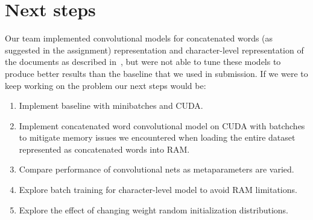 \documentclass{article} %
\begin{document}
	

	

\section{Next steps}
\label{next}
Our team implemented convolutional models for concatenated words (as suggested in the assignment) representation and character-level representation of the documents as described in~\cite{zhang15}, but were not able to tune these models to produce better results than the baseline that we used in submission.
If we were to keep working on the problem our next steps would be:
\begin{enumerate}
\item Implement baseline with minibatches and CUDA.
\item Implement concatenated word convolutional model on CUDA with batchches to mitigate memory issues we encountered when loading 
the entire dataset represented as concatenated words into RAM.
\item Compare performance of convolutional nets as metaparameters are varied.
\item Explore batch training for character-level model to avoid RAM limitations.
\item Explore the effect of changing weight random initialization distributions.
\end{enumerate}

{}

\end{document}
